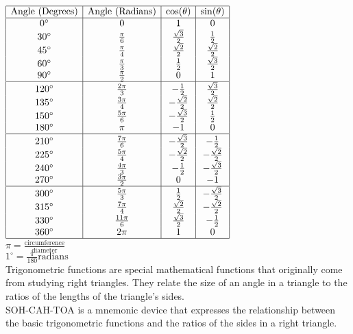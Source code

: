 \documentclass{article}
\begin{document}
$
\begin{array}{|c|c|c|c|}
\hline
\text{Angle (Degrees)} & \text{Angle (Radians)} & \cos(\theta) & \sin(\theta) \\
\hline
0^\circ & 0 & 1 & 0 \\
30^\circ & \frac{\pi}{6} & \frac{\sqrt{3}}{2} & \frac{1}{2} \\
45^\circ & \frac{\pi}{4} & \frac{\sqrt{2}}{2} & \frac{\sqrt{2}}{2} \\
60^\circ & \frac{\pi}{3} & \frac{1}{2} & \frac{\sqrt{3}}{2} \\
90^\circ & \frac{\pi}{2} & 0 & 1 \\
\hline
120^\circ & \frac{2\pi}{3} & -\frac{1}{2} & \frac{\sqrt{3}}{2} \\
135^\circ & \frac{3\pi}{4} & -\frac{\sqrt{2}}{2} & \frac{\sqrt{2}}{2} \\
150^\circ & \frac{5\pi}{6} & -\frac{\sqrt{3}}{2} & \frac{1}{2} \\
180^\circ & \pi & -1 & 0 \\
\hline
210^\circ & \frac{7\pi}{6} & -\frac{\sqrt{3}}{2} & -\frac{1}{2} \\
225^\circ & \frac{5\pi}{4} & -\frac{\sqrt{2}}{2} & -\frac{\sqrt{2}}{2} \\
240^\circ & \frac{4\pi}{3} & -\frac{1}{2} & -\frac{\sqrt{3}}{2} \\
270^\circ & \frac{3\pi}{2} & 0 & -1 \\
\hline
300^\circ & \frac{5\pi}{3} & \frac{1}{2} & -\frac{\sqrt{3}}{2} \\
315^\circ & \frac{7\pi}{4} & \frac{\sqrt{2}}{2} & -\frac{\sqrt{2}}{2} \\
330^\circ & \frac{11\pi}{6} & \frac{\sqrt{3}}{2} & -\frac{1}{2} \\
360^\circ & 2\pi & 1 & 0 \\
\hline
\end{array}
$\\

$\pi = \frac{\text{circumference}}{\text{diameter}}$\\
$1^\circ = \frac{\pi}{180} \text{radians}$\\

Trigonometric functions are special mathematical functions that originally come from studying right triangles. They relate the size of an angle in a triangle to the ratios of the lengths of the triangle's sides.\\

SOH-CAH-TOA is a mnemonic device that expresses the relationship between the basic trigonometric functions and the ratios of the sides in a right triangle.\\
\end{document}
